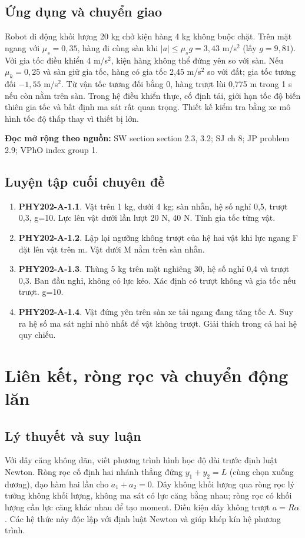 \documentclass[11pt,a4paper,openany]{book}
\begin{document}
\section{Ứng dụng và chuyển giao}
Robot di động khối lượng 20 kg chở kiện hàng 4 kg không buộc chặt. Trên mặt ngang với $\mu_s=0{,}35$, hàng đi cùng sàn khi $|a|\leq\mu_sg=3{,}43$ m/s$^2$ (lấy $g=9{,}81$). Với gia tốc điều khiển 4 m/s$^2$, kiện hàng không thể đứng yên so với sàn. Nếu $\mu_k=0{,}25$ và sàn giữ gia tốc, hàng có gia tốc 2,45 m/s$^2$ so với đất; gia tốc tương đối $-1{,}55$ m/s$^2$. Từ vận tốc tương đối bằng 0, hàng trượt lùi 0,775 m trong 1 s nếu còn nằm trên sàn. Trong hệ điều khiển thực, cố định tải, giới hạn tốc độ biến thiên gia tốc và bất định ma sát rất quan trọng. Thiết kế kiểm tra bằng xe mô hình tốc độ thấp thay vì thiết bị lớn.

\textbf{Đọc mở rộng theo nguồn:} SW section section 2.3, 3.2; SJ ch 8; JP problem 2.9; VPhO index group 1.

\section{Luyện tập cuối chuyên đề}
\begin{enumerate}
\item \textbf{PHY202-A-1.1}. Vật trên 1 kg, dưới 4 kg; sàn nhẵn, hệ số nghỉ 0,5, trượt 0,3, g=10. Lực lên vật dưới lần lượt 20 N, 40 N. Tính gia tốc từng vật.
\item \textbf{PHY202-A-1.2}. Lập lại ngưỡng không trượt của hệ hai vật khi lực ngang F đặt lên vật trên m. Vật dưới M nằm trên sàn nhẵn.
\item \textbf{PHY202-A-1.3}. Thùng 5 kg trên mặt nghiêng 30\textdegree{}, hệ số nghỉ 0,4 và trượt 0,3. Ban đầu nghỉ, không có lực kéo. Xác định có trượt không và gia tốc nếu trượt. g=10.
\item \textbf{PHY202-A-1.4}. Vật đứng yên trên sàn xe tải ngang đang tăng tốc A. Suy ra hệ số ma sát nghỉ nhỏ nhất để vật không trượt. Giải thích trong cả hai hệ quy chiếu.
\end{enumerate}
\chapter{Liên kết, ròng rọc và chuyển động lăn}
\section{Lý thuyết và suy luận}
Với dây căng không dãn, viết phương trình hình học độ dài trước định luật Newton. Ròng rọc cố định hai nhánh thẳng đứng $y_1+y_2=L$ (cùng chọn xuống dương), đạo hàm hai lần cho $a_1+a_2=0$. Dây không khối lượng qua ròng rọc lý tưởng không khối lượng, không ma sát có lực căng bằng nhau; ròng rọc có khối lượng cần lực căng khác nhau để tạo moment. Điều kiện dây không trượt $a=R\alpha$. Các hệ thức này độc lập với định luật Newton và giúp khép kín hệ phương trình.
\end{document}
